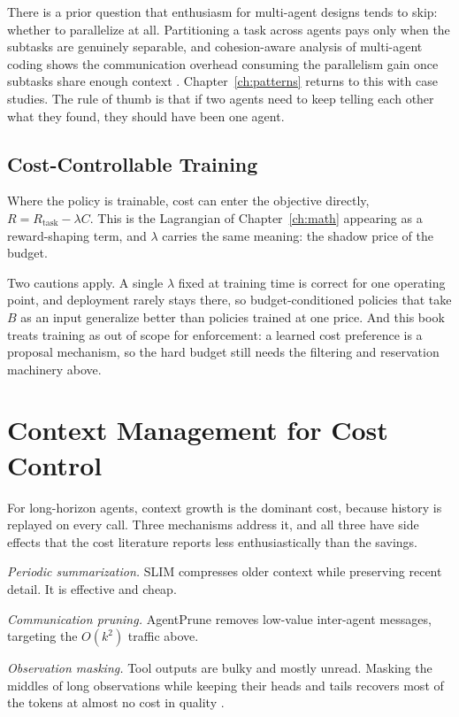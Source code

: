 \documentclass[11pt]{book}
\begin{document}
There is a prior question that enthusiasm for multi-agent designs tends to skip: whether to parallelize at all. Partitioning a task across agents pays only when the subtasks are genuinely separable, and cohesion-aware analysis of multi-agent coding shows the communication overhead consuming the parallelism gain once subtasks share enough context \cite{cohesion2026}. Chapter~\ref{ch:patterns} returns to this with case studies. The rule of thumb is that if two agents need to keep telling each other what they found, they should have been one agent.

\subsection{Cost-Controllable Training}

Where the policy is trainable, cost can enter the objective directly, $R = R_{\text{task}} - \lambda C$. This is the Lagrangian of Chapter~\ref{ch:math} appearing as a reward-shaping term, and $\lambda$ carries the same meaning: the shadow price of the budget.

Two cautions apply. A single $\lambda$ fixed at training time is correct for one operating point, and deployment rarely stays there, so budget-conditioned policies that take $B$ as an input generalize better than policies trained at one price. And this book treats training as out of scope for enforcement: a learned cost preference is a proposal mechanism, so the hard budget still needs the filtering and reservation machinery above.

\section{Context Management for Cost Control}

For long-horizon agents, context growth is the dominant cost, because history is replayed on every call. Three mechanisms address it, and all three have side effects that the cost literature reports less enthusiastically than the savings.

\textit{Periodic summarization.} SLIM \cite{slim2025} compresses older context while preserving recent detail. It is effective and cheap.

\textit{Communication pruning.} AgentPrune \cite{agentprune2025} removes low-value inter-agent messages, targeting the $O(k^2)$ traffic above.

\textit{Observation masking.} Tool outputs are bulky and mostly unread. Masking the middles of long observations while keeping their heads and tails recovers most of the tokens at almost no cost in quality \cite{observationmasking2025}.
\end{document}
